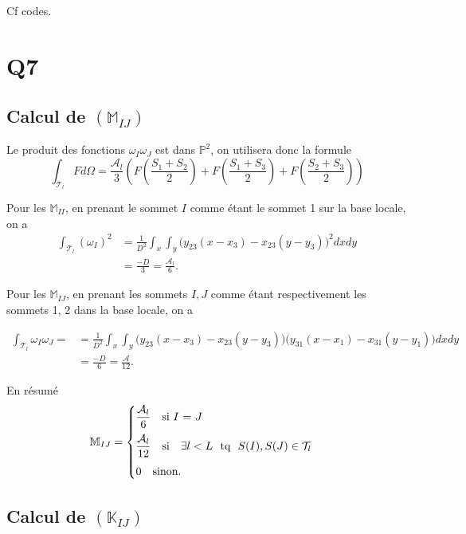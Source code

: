 \documentclass[11pt]{article}
\newcommand{\A}{\mathcal{A}}
\newcommand{\K}{\mathbb{K}}
\newcommand{\M}{\mathbb{M}}
\newcommand{\ms}{~~~}
\begin{document}
Cf codes.

\section{Q7}

\subsection{Calcul de $(\M_{IJ})$}

Le produit des fonctions $\omega_I\omega_J$ est dans $\mathbb{P}^2$, on utilisera donc la formule
\begin{equation}
  \int_{\mathcal{T}_l} F d\Omega = \frac{\A_l}{3}\left(F\left(\frac{S_1+S_2}{2}\right) + F\left(\frac{S_1+S_3}{2}\right) + F\left(\frac{S_2+S_3}{2}\right) \right)
\end{equation}

Pour les $\M_{II}$, en prenant le sommet $I$ comme étant le sommet 1 sur la base locale, on a 
\begin{align}
  \int_{\mathcal{T}_l} (\omega_I)^2
  &= \frac{1}{D^2} \int_x \int_y \big(y_{23} (x-x_3) - x_{23} (y-y_3)\big)^2 dx dy \\
  &= \frac{-D}{3} = \frac{\A_l}{6}.
\end{align}

Pour les $\M_{IJ}$, en prenant les sommets $I, J$ comme étant respectivement les sommets 1, 2 dans la base locale, on a

\begin{align}
  \int_{\mathcal{T}_l} \omega_I \omega_J =
  &= \frac{1}{D^2} \int_x \int_y \big(y_{23} (x-x_3) - x_{23} (y-y_3)\big)\big(y_{31} (x-x_1) - x_{31} (y-y_1)\big) dx dy \\
  &= \frac{-D}{6} = \frac{\A}{12}.
\end{align}

En résumé
\begin{equation}
  \M_{IJ} =
  \begin{cases}
    \dfrac{\A_l}{6} \ms \mbox{si $I$ = $J$} \medskip\\
    \dfrac{\A_l}{12} \ms \mbox{si} \ms \exists l < L \mbox{~~tq~~} S(I), S(J) \in \mathcal{T}_l \medskip\\
    0 \ms \mbox{sinon}.
  \end{cases}
\end{equation}


\subsection{Calcul de $(\K_{IJ})$}
\end{document}
